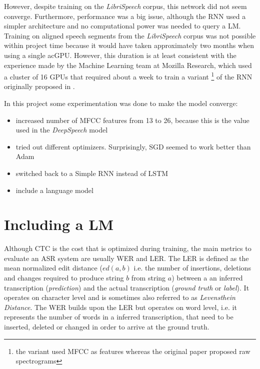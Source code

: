 However, despite training on the \textit{LibriSpeech} corpus, this network did not seem converge. Furthermore, performance was a big issue, although the \ac{RNN} used a simpler architecture and no computational power was needed to query a \ac{LM}. Training on aligned speech segments from the \textit{LibriSpeech} corpus was not possible within project time because it would have taken approximately two months when using a single ac{GPU}. However, this duration is at least consistent with the experience made by the Machine Learning team at Mozilla Research, which used a cluster of 16 \acsp{GPU} that required about a week \parencite{mozillajourney} to train a variant \footnote{the variant used \ac{MFCC} as features whereas the original paper proposed raw spectrograms} of the \ac{RNN} originally proposed in \parencite{ctc_paper}.

In this project some experimentation was done to make the model converge:

\begin{itemize}
	\item increased number of \ac{MFCC} features from 13 to 26, because this is the value used in the \textit{DeepSpeech} model
	\item tried out different optimizers. Surprisingly, \ac{SGD} seemed to work better than Adam
	\item switched back to a Simple \ac{RNN} instead of \ac{LSTM}
	\item include a language model
\end{itemize}

\section{Including a \ac{LM}}

Although \ac{CTC} is the cost that is optimized during training, the main metrics to evaluate an \ac{ASR} system are usually \ac{WER} and \ac{LER}. The \ac{LER} is defined as the mean normalized edit distance ($ed(a, b)$ i.e. the number of insertions, deletions and changes required to produce string $b$ from string $a$) between a an inferred transcription (\textit{prediction}) and the actual transcription (\textit{ground truth} or \textit{label}). It operates on character level and is sometimes also referred to as \textit{Levensthein Distance}. The \ac{WER} builds upon the \ac{LER} but operates on word level, i.e. it represents the number of words in a inferred transcription, that need to be inserted, deleted or changed in order to arrive at the ground truth.

